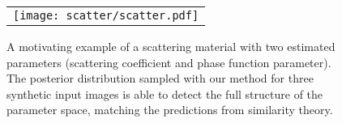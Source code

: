 \begin{figure}[t]
	\centering
	\addtolength{\tabcolsep}{-3pt}
	\begin{tabular}{c}
		\texttt{[image: scatter/scatter.pdf]}
	\end{tabular}
	\captionsetup{labelfont=bf,textfont=it}
	\caption{\label{fig:scatter}
		A motivating example of a scattering material with two estimated parameters (scattering coefficient and phase function parameter). The posterior distribution sampled with our method for three synthetic input images is able to detect the full structure of the parameter space, matching the predictions from similarity theory.
	}
\end{figure}

